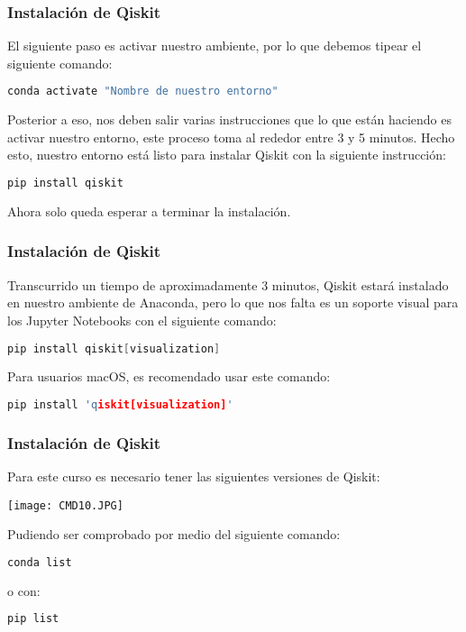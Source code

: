 \documentclass[spanish]{beamer}
\begin{document}
\begin{frame}[fragile]\frametitle{Instalación de Qiskit}
\justify\setlength{\parskip}{5mm}
El siguiente paso es activar nuestro ambiente, por lo que debemos tipear el siguiente comando:
\begin{lstlisting}[language=c++]
conda activate "Nombre de nuestro entorno" \end{lstlisting}

Posterior a eso, nos deben salir varias instrucciones que lo que están haciendo es activar nuestro entorno, este proceso toma al rededor entre 3 y 5 minutos. Hecho esto, nuestro entorno está listo para instalar Qiskit con la siguiente instrucción:
\begin{lstlisting}[language=c++]
pip install qiskit \end{lstlisting}
Ahora solo queda esperar a terminar la instalación.
\end{frame}
\begin{frame}[fragile]\frametitle{Instalación de Qiskit}
\justify\setlength{\parskip}{5mm}
Transcurrido un tiempo de aproximadamente 3 minutos, Qiskit estará instalado en nuestro ambiente de Anaconda, pero lo que nos falta es un soporte visual para los Jupyter Notebooks con el siguiente comando:
\begin{lstlisting}[language=c++]
pip install qiskit[visualization] \end{lstlisting}

Para usuarios macOS, es recomendado usar este comando:
\begin{lstlisting}[language=c++]
pip install 'qiskit[visualization]'\end{lstlisting}
\end{frame}
\begin{frame}[fragile]\frametitle{Instalación de Qiskit}
\justify\setlength{\parskip}{5mm}
Para este curso es necesario tener las siguientes versiones de Qiskit:

\centering \texttt{[image: CMD10.JPG]}

Pudiendo ser comprobado por medio del siguiente comando:
\begin{lstlisting}[language=c++]
conda list\end{lstlisting}
 o con:
\begin{lstlisting}[language=c++]
pip list\end{lstlisting}
\end{frame}
\end{document}

